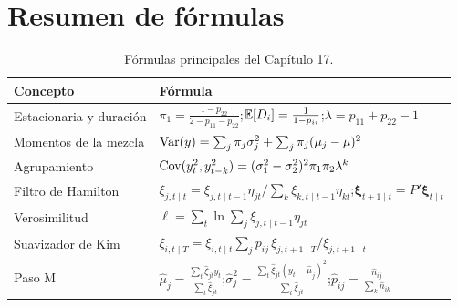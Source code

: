 \section{Resumen de fórmulas}

\begin{table}[H]
\centering\small
\begin{tabular}{@{}ll@{}}
\toprule
Concepto & Fórmula \\
\midrule
Estacionaria y duración & $\pi_1=\frac{1-p_{22}}{2-p_{11}-p_{22}}$;\quad $\mathbb{E}[D_i]=\frac1{1-p_{ii}}$;\quad $\lambda=p_{11}+p_{22}-1$ \\
Momentos de la mezcla & $\operatorname{Var}(y)=\sum_j\pi_j\sigma_j^2+\sum_j\pi_j(\mu_j-\bar\mu)^2$ \\
Agrupamiento & $\operatorname{Cov}(y_t^2,y_{t-k}^2)=(\sigma_1^2-\sigma_2^2)^2\pi_1\pi_2\lambda^k$ \\
Filtro de Hamilton & $\xi_{j,t\mid t}=\xi_{j,t\mid t-1}\eta_{jt}/\sum_k\xi_{k,t\mid t-1}\eta_{kt}$;\quad $\boldsymbol\xi_{t+1\mid t}=P'\boldsymbol\xi_{t\mid t}$ \\
Verosimilitud & $\ell=\sum_t\ln\sum_j\xi_{j,t\mid t-1}\eta_{jt}$ \\
Suavizador de Kim & $\xi_{i,t\mid T}=\xi_{i,t\mid t}\sum_jp_{ij}\,\xi_{j,t+1\mid T}/\xi_{j,t+1\mid t}$ \\
Paso M & $\hat\mu_j=\frac{\sum_t\hat\xi_{jt}y_t}{\sum_t\hat\xi_{jt}}$;\quad $\hat\sigma_j^2=\frac{\sum_t\hat\xi_{jt}(y_t-\hat\mu_j)^2}{\sum_t\hat\xi_{jt}}$;\quad $\hat p_{ij}=\frac{\hat n_{ij}}{\sum_k\hat n_{ik}}$ \\
\bottomrule
\end{tabular}
\caption{Fórmulas principales del Capítulo 17.}
\end{table}

